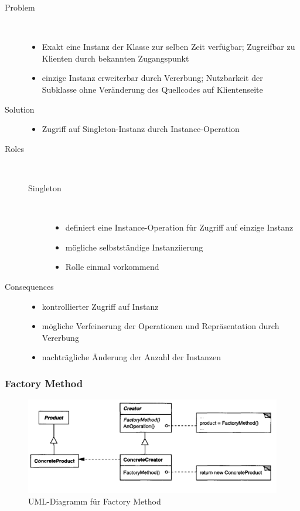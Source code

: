 \begin{description}
    \item[Problem] \hfill \\
    \begin{itemize}
        \item Exakt eine Instanz der Klasse zur selben Zeit verfügbar; Zugreifbar zu Klienten durch bekannten Zugangspunkt
        \item einzige Instanz erweiterbar durch Vererbung; Nutzbarkeit der Subklasse ohne Veränderung des Quellcodes auf Klientenseite
    \end{itemize}
    \item[Solution] \hfill
    \begin{itemize}
        \item  Zugriff auf Singleton-Instanz durch Instance-Operation
    \end{itemize}
    \item[Roles] \hfill \\
    \begin{description}
        \item[Singleton] \hfill \\
        \begin{itemize}
            \item definiert eine Instance-Operation für Zugriff auf einzige Instanz
            \item mögliche selbstständige Instanziierung
            \item Rolle einmal vorkommend
        \end{itemize}
    \end{description}
    \item[Consequences]  \hfill 
    \begin{itemize}
        \item kontrollierter Zugriff auf Instanz
        \item mögliche Verfeinerung der Operationen und Repräsentation durch Vererbung
        \item nachträgliche Änderung der Anzahl der Instanzen 
    \end{itemize}
\end{description}

\subsubsection{Factory Method}

\begin{figure}[h]
    \centering
    \includegraphics[scale=0.8]{figures/factory.png}
    \caption{UML-Diagramm für Factory Method}
    \label{fig:factory}
\end{figure}

